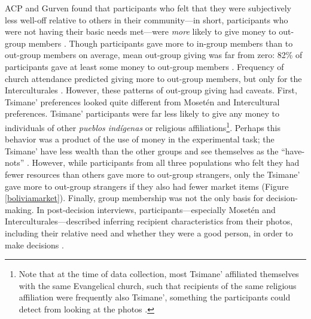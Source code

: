 \documentclass[bibauthoryear]{aa}
\begin{document}
ACP and Gurven found that participants who felt that they were subjectively less well-off relative to others in their community---in short, participants who were not having their basic needs met---were \emph{more} likely to give money to out-group members \citep{pisor2016risk}. Though participants gave more to in-group members than to out-group members on average, mean out-group giving was far from zero: 82\% of participants gave at least some money to out-group members \citep{pisor2018diversify}. Frequency of church attendance predicted giving more to out-group members, but only for the Interculturales \citep{pisor2016risk}. However, these patterns of out-group giving had caveats. First, Tsimane' preferences looked quite different from Moset\'en and Intercultural preferences. Tsimane' participants were far less likely to give any money to individuals of other \textit{pueblos ind\'igenas} or  religious affiliations\footnote{Note that at the time of data collection, most Tsimane' affiliated themselves with the same Evangelical church, such that recipients of the same religious affiliation were frequently also Tsimane', something the participants could detect from looking at the photos \citep{pisor2018diversify}.}. Perhaps this behavior was a product of the use of money in the experimental task; the Tsimane' have less wealth than the other groups and see themselves as the ``have-nots''  \citep{pisor2018diversify}. However, while participants from all three populations who felt they had fewer resources than others gave more to out-group strangers, only the Tsimane' gave more to out-group strangers if they also had fewer market items  (Figure \ref{boliviamarket}). Finally, group membership was not the only basis for decision-making. In post-decision interviews, participants---especially Moset\'en and Interculturales---described inferring recipient characteristics from their photos, including their relative need and whether they were a good person, in order to make decisions \citep{pisor2018diversify, Pisor2020}.
\end{document}
